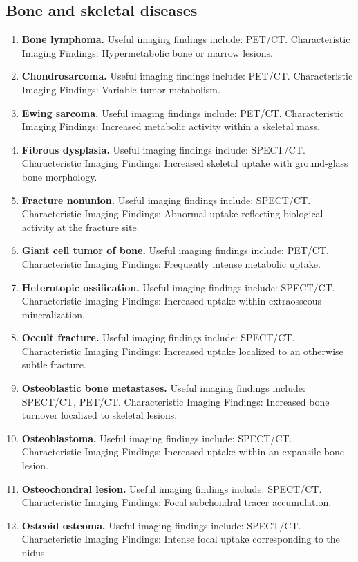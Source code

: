 \subsection{Bone and skeletal diseases}
\begin{enumerate}[leftmargin=*,itemsep=0.45em,topsep=0.4em]
\item \textbf{Bone lymphoma.} Useful imaging findings include: PET/CT. Characteristic Imaging Findings: Hypermetabolic bone or marrow lesions.
\item \textbf{Chondrosarcoma.} Useful imaging findings include: PET/CT. Characteristic Imaging Findings: Variable tumor metabolism.
\item \textbf{Ewing sarcoma.} Useful imaging findings include: PET/CT. Characteristic Imaging Findings: Increased metabolic activity within a skeletal mass.
\item \textbf{Fibrous dysplasia.} Useful imaging findings include: SPECT/CT. Characteristic Imaging Findings: Increased skeletal uptake with ground-glass bone morphology.
\item \textbf{Fracture nonunion.} Useful imaging findings include: SPECT/CT. Characteristic Imaging Findings: Abnormal uptake reflecting biological activity at the fracture site.
\item \textbf{Giant cell tumor of bone.} Useful imaging findings include: PET/CT. Characteristic Imaging Findings: Frequently intense metabolic uptake.
\item \textbf{Heterotopic ossification.} Useful imaging findings include: SPECT/CT. Characteristic Imaging Findings: Increased uptake within extraosseous mineralization.
\item \textbf{Occult fracture.} Useful imaging findings include: SPECT/CT. Characteristic Imaging Findings: Increased uptake localized to an otherwise subtle fracture.
\item \textbf{Osteoblastic bone metastases.} Useful imaging findings include: SPECT/CT, PET/CT. Characteristic Imaging Findings: Increased bone turnover localized to skeletal lesions.
\item \textbf{Osteoblastoma.} Useful imaging findings include: SPECT/CT. Characteristic Imaging Findings: Increased uptake within an expansile bone lesion.
\item \textbf{Osteochondral lesion.} Useful imaging findings include: SPECT/CT. Characteristic Imaging Findings: Focal subchondral tracer accumulation.
\item \textbf{Osteoid osteoma.} Useful imaging findings include: SPECT/CT. Characteristic Imaging Findings: Intense focal uptake corresponding to the nidus.

\end{enumerate}
